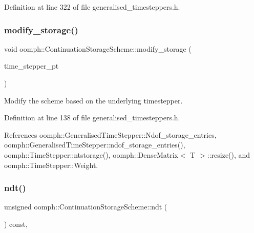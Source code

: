 Definition at line 322 of file generalised\+\_\+timesteppers.\+h.

\mbox{\label{classoomph_1_1ContinuationStorageScheme_a48726b336985f9c71e10a01fdded177b}} 
\subsubsection{\texorpdfstring{modify\+\_\+storage()}{modify\_storage()}}
{\footnotesize\ttfamily void oomph\+::\+Continuation\+Storage\+Scheme\+::modify\+\_\+storage (\begin{DoxyParamCaption}\item[{\hyperlink{classoomph_1_1GeneralisedTimeStepper}{Generalised\+Time\+Stepper} $\ast$const \&}]{time\+\_\+stepper\+\_\+pt }\end{DoxyParamCaption})\hspace{0.3cm}{\ttfamily [inline]}}



Modify the scheme based on the underlying timestepper. 



Definition at line 138 of file generalised\+\_\+timesteppers.\+h.



References oomph\+::\+Generalised\+Time\+Stepper\+::\+Ndof\+\_\+storage\+\_\+entries, oomph\+::\+Generalised\+Time\+Stepper\+::ndof\+\_\+storage\+\_\+entries(), oomph\+::\+Time\+Stepper\+::ntstorage(), oomph\+::\+Dense\+Matrix$<$ T $>$\+::resize(), and oomph\+::\+Time\+Stepper\+::\+Weight.

\mbox{\label{classoomph_1_1ContinuationStorageScheme_aedf54b092d3f98b60b49190cb5dad540}} 
\subsubsection{\texorpdfstring{ndt()}{ndt()}}
{\footnotesize\ttfamily unsigned oomph\+::\+Continuation\+Storage\+Scheme\+::ndt (\begin{DoxyParamCaption}{ }\end{DoxyParamCaption}) const\hspace{0.3cm}{\ttfamily [inline]}, {\ttfamily [virtual]}}



